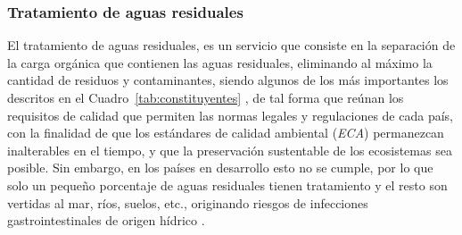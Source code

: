 \subsubsection*{Tratamiento de aguas residuales}
El tratamiento de aguas residuales, es un servicio que consiste en la separación de la carga orgánica que contienen las aguas residuales, eliminando al máximo la cantidad de residuos y contaminantes, siendo algunos de los más importantes los descritos en el Cuadro~\ref{tab:constituyentes} \emph{\citep{tratGOB, ron}}, de tal forma que reúnan los requisitos de calidad que permiten las normas legales y regulaciones de cada país, con la finalidad de que los estándares de calidad ambiental (\emph{ECA}) permanezcan inalterables en el tiempo, y que la preservación sustentable de los ecosistemas sea posible. Sin embargo, en los países en desarrollo esto no se cumple, por lo que solo un pequeño porcentaje de aguas residuales tienen tratamiento y el resto son vertidas al mar, ríos, suelos, etc., originando riesgos de infecciones gastrointestinales de origen hídrico \emph{\citep{carreno17}}.\\
